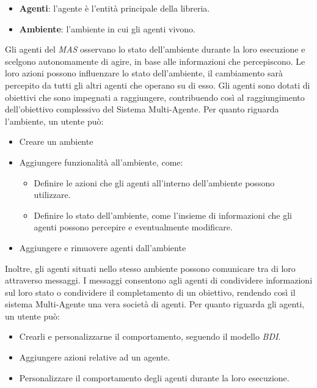 \begin{itemize}
    \item \textbf{Agenti}: l'agente è l'entità principale della libreria.
    \item \textbf{Ambiente}: l'ambiente in cui gli agenti vivono.
\end{itemize}

Gli agenti del \textit{MAS} osservano lo stato dell'ambiente durante la loro esecuzione e scelgono autonomamente di agire, in base alle informazioni che percepiscono. Le loro azioni possono influenzare lo stato dell'ambiente, il cambiamento sarà percepito da tutti gli altri agenti che operano su di esso. Gli agenti sono dotati di obiettivi che sono impegnati a raggiungere, contribuendo così al raggiungimento dell'obiettivo complessivo del Sistema Multi-Agente. Per quanto riguarda l'ambiente, un utente può:

\begin{itemize}
    \item Creare un ambiente
    \item Aggiungere funzionalità all'ambiente, come:
    \begin{itemize}
        \item Definire le azioni che gli agenti all'interno dell'ambiente possono utilizzare.
        \item Definire lo stato dell'ambiente, come l'insieme di informazioni che gli agenti possono percepire e eventualmente modificare.
    \end{itemize}
    \item Aggiungere e rimuovere agenti dall'ambiente
\end{itemize}

Inoltre, gli agenti situati nello stesso ambiente possono comunicare tra di loro attraverso messaggi. I messaggi consentono agli agenti di condividere informazioni sul loro stato o condividere il completamento di un obiettivo, rendendo così il sistema Multi-Agente una vera società di agenti. Per quanto riguarda gli agenti, un utente può:

\begin{itemize}
    \item Crearli e personalizzarne il comportamento, seguendo il modello \textit{BDI}.
    \item Aggiungere azioni relative ad un agente.
    \item Personalizzare il comportamento degli agenti durante la loro esecuzione.
\end{itemize}

